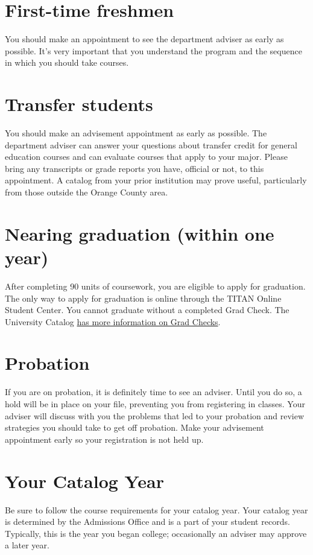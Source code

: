 \documentclass{book}
\begin{document}
\section{First-time freshmen}
You should make an appointment to see the department adviser as early as possible. It’s very important that you understand the program and the sequence in which you should take courses.

\section{Transfer students}
You should make an advisement appointment as early as possible. The department adviser can answer your questions about transfer credit for general education courses and can evaluate courses that apply to your major. Please bring any transcripts or grade reports you have, official or not, to this appointment. A catalog from your prior institution may prove useful, particularly from those outside the Orange County area.

\section{Nearing graduation (within one year)}
After completing 90 units of coursework, you are eligible to apply for graduation. The only way to apply for graduation is online through the TITAN Online Student Center. You cannot graduate without a completed Grad Check.  The University Catalog \href{http://catalog.fullerton.edu/content.php?catoid=2&navoid=108#Graduation_Requirement_Check}{has more information on Grad Checks}.

\section{Probation}
If you are on probation, it is definitely time to see an adviser. Until you do so, a hold will be in place on your file, preventing you from registering in classes. Your adviser will discuss with you the problems that led to your probation and review strategies you should take to get off probation. Make your advisement appointment early so your registration is not held up.

\section{Your Catalog Year}
Be sure to follow the course requirements for your catalog year. Your catalog year is determined by the Admissions Office and is a part of your student records. Typically, this is the year you began college; occasionally an adviser may approve a later year.
\end{document}
